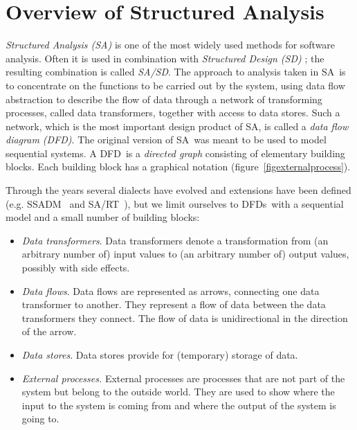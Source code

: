 \documentclass[11pt]{article}
\newcommand{\figdir}{/home/peter/toolbox}
\newcommand{\SA}{{\small SA}}
\newcommand{\SASD}{{\small SA/SD}}
\newcommand{\DFD}{{\small DFD}}
\newcommand{\DFDs}{{\small DFD}s}
\newcommand{\makefigure}[3]{\begin{figure}[ht]
{\leavevmode
\centering
\epsfbox{\figdir/#1.eps}
\caption{#2}\label{#3}}
\end{figure}}
\begin{document}
\section{Overview of Structured Analysis}
\label{sec:sa}

{\em Structured Analysis ({\small\it SA})}
\cite{Yourdon75,Demarco78,Gane77} is one of
the most widely used methods for software analysis.
Often it is used in combination with {\em Structured Design ({\small\it SD})}
\cite{Yourdon75}; the resulting combination is called {\em \SASD}.
The approach to analysis taken in \SA\ is to concentrate on the functions
to be carried out by the system, using data flow abstraction to
describe the flow of data through a network of transforming
processes, called data transformers, together with access to data stores.
Such a network, which is the most important design product of \SA,
is called a {\em data flow diagram (DFD)}. The original version of
\SA\ was meant to be used to model sequential systems.  
A \DFD\ is a {\em directed graph} consisting of elementary building blocks.
Each building block has a graphical notation (figure~\ref{figexternalprocess}).


Through the years several dialects have evolved and extensions
have been defined (e.g. {\small SSADM}\ \cite{Longworth&86} and {\small SA/RT}\
\cite{Ward85}), 
but we limit ourselves to \DFDs\ with a sequential model and
a small number of building blocks:
\begin{itemize}
\item
{\em Data transformers}. Data transformers denote a transformation from
(an arbitrary number of) input values to
(an arbitrary number of) output values, possibly with side effects.
\item
{\em Data flows}. Data flows are represented as arrows, connecting one
data transformer to another. They represent a flow of data between the
data transformers they connect.
The flow of data is unidirectional in the direction of the arrow.
\item
{\em Data stores}. Data stores provide for (temporary) storage of data.
\item
{\em External processes.}
External processes are processes that are not part of the system but belong
to the outside world. They are used to show where the input to the system
is coming from and where the output of the system is going to.
\end{itemize}
\end{document}

